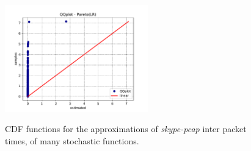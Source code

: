 \begin{figure}[ht!]
{        \includegraphics[width=62mm]{figures/ch4/Skype_QQplot_-_Pareto(LR)}
    }
    \hspace{0mm}
    \caption{CDF functions for the approximations of \textit{skype-pcap} inter packet times, of many stochastic functions.}
    \label{fig:qq-skype}
\end{figure}

